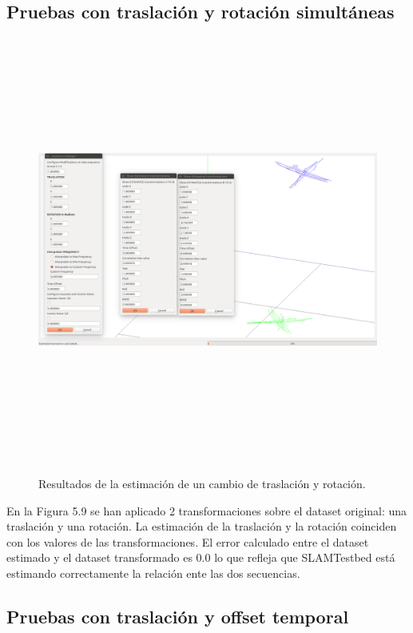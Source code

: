 \subsection{Pruebas con traslación y rotación simultáneas}
\begin{figure}[H]
\begin{center}
\label{fig:opciones de View}\includegraphics[height=14.0cm,width=18.0cm]{img/cap6/Trasla_Rota_abba.png}
\hspace{0.5cm}

\end{center}

\caption{Resultados de la estimación de un cambio de traslación y rotación.}
\end{figure}

En la Figura 5.9 se han aplicado 2 transformaciones sobre el dataset original: una traslación y una rotación.
La estimación de la traslación y la rotación coinciden con los valores de las transformaciones. El error calculado entre el dataset estimado y el dataset transformado es 0.0 lo que refleja que SLAMTestbed está estimando correctamente la relación ente las dos secuencias.

\subsection{Pruebas con traslación y offset temporal}

